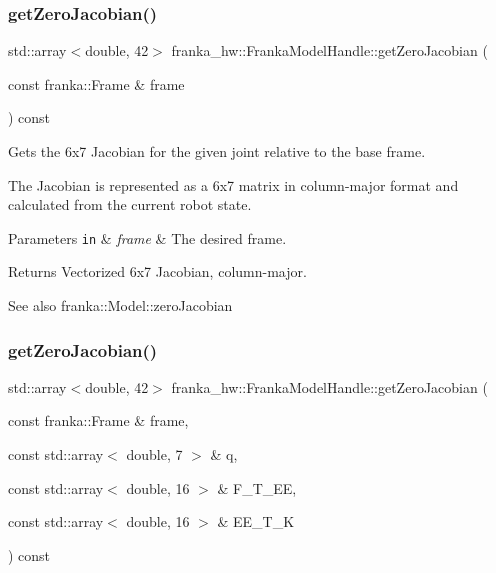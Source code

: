 \subsubsection{\texorpdfstring{get\+Zero\+Jacobian()}{getZeroJacobian()}\hspace{0.1cm}{\footnotesize\ttfamily [1/2]}}
{\footnotesize\ttfamily std\+::array$<$double, 42$>$ franka\+\_\+hw\+::\+Franka\+Model\+Handle\+::get\+Zero\+Jacobian (\begin{DoxyParamCaption}\item[{const franka\+::\+Frame \&}]{frame }\end{DoxyParamCaption}) const\hspace{0.3cm}{\ttfamily [inline]}}

Gets the 6x7 Jacobian for the given joint relative to the base frame.

The Jacobian is represented as a 6x7 matrix in column-\/major format and calculated from the current robot state.


\begin{DoxyParams}[1]{Parameters}
\mbox{\tt in}  & {\em frame} & The desired frame.\\
\hline
\end{DoxyParams}
\begin{DoxyReturn}{Returns}
Vectorized 6x7 Jacobian, column-\/major.
\end{DoxyReturn}
\begin{DoxySeeAlso}{See also}
franka\+::\+Model\+::zero\+Jacobian 
\end{DoxySeeAlso}
\mbox{\label{classfranka__hw_1_1_franka_model_handle_a5ce6ac6116ac3c45c923e5c2d515616c}} 
\subsubsection{\texorpdfstring{get\+Zero\+Jacobian()}{getZeroJacobian()}\hspace{0.1cm}{\footnotesize\ttfamily [2/2]}}
{\footnotesize\ttfamily std\+::array$<$double, 42$>$ franka\+\_\+hw\+::\+Franka\+Model\+Handle\+::get\+Zero\+Jacobian (\begin{DoxyParamCaption}\item[{const franka\+::\+Frame \&}]{frame,  }\item[{const std\+::array$<$ double, 7 $>$ \&}]{q,  }\item[{const std\+::array$<$ double, 16 $>$ \&}]{F\+\_\+\+T\+\_\+\+EE,  }\item[{const std\+::array$<$ double, 16 $>$ \&}]{E\+E\+\_\+\+T\+\_\+K }\end{DoxyParamCaption}) const\hspace{0.3cm}{\ttfamily [inline]}}

